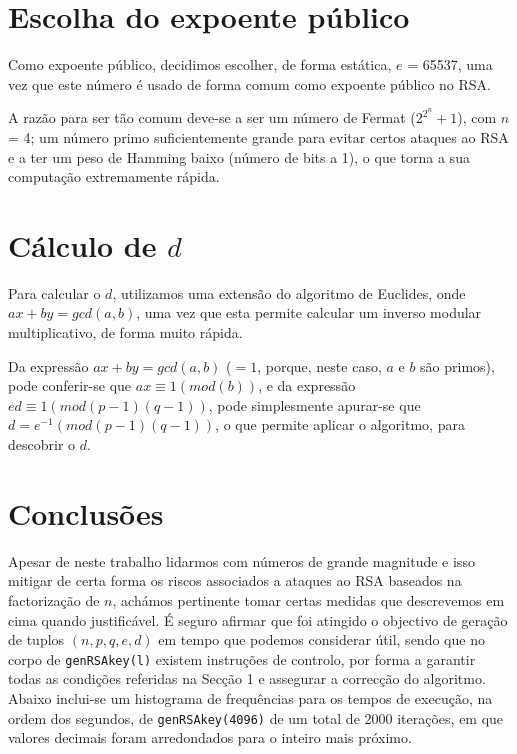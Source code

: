 \documentclass[dvipsnames]{article}
\begin{document}
\begin{multicols}{2}
  \section{Escolha do expoente público}
  Como expoente público, decidimos escolher, de forma estática, $e$ =  65537, uma vez que este número é usado de forma comum como expoente público no RSA.
  
  \vskip 0.4cm
  
  \noindent A razão para ser tão comum deve-se a ser um número de Fermat (${2^{2^n}}+1$), com $n$ = 4; um número primo suficientemente grande para evitar certos ataques ao RSA e a ter um peso de Hamming baixo (número de bits a 1), o que torna a sua computação extremamente rápida.
  
  \section{Cálculo de $d$}
  Para calcular o $d$, utilizamos uma extensão do algoritmo de Euclides, onde $ax + by = gcd(a,b)$, uma vez que esta permite calcular um inverso modular multiplicativo, de forma muito rápida.
  
  \vskip 0.4cm
  
  \noindent Da expressão $ax + by = gcd(a,b)$ ($=1$, porque, neste caso, $a$ e $b$ são primos), pode conferir-se que $ax \equiv 1 (mod (b))$, e da expressão $ed \equiv 1 (mod (p-1)(q-1))$, pode simplesmente apurar-se que $d = e^{-1} (mod (p-1)(q-1))$, o que permite aplicar o algoritmo, para descobrir o $d$.
  
  \section{Conclusões}
  
  Apesar de neste trabalho lidarmos com números de grande magnitude e isso mitigar de certa forma os riscos associados a ataques ao RSA baseados na factorização de $n$, achámos pertinente tomar certas medidas que descrevemos em cima quando justificável. É seguro afirmar que foi atingido o objectivo de geração de tuplos $(n,p,q,e,d)$ em tempo que podemos considerar útil, sendo que no corpo de \texttt{genRSAkey(l)} existem instruções de controlo, por forma a garantir todas as condições referidas na Secção 1 e assegurar a correcção do algoritmo.\\
  
  \noindent Abaixo inclui-se um histograma de frequências para os tempos de execução, na ordem dos segundos, de \texttt{genRSAkey(4096)} de um total de $2000$ iterações, em que valores decimais foram arredondados para o inteiro mais próximo.
  

\end{multicols}
\end{document}
